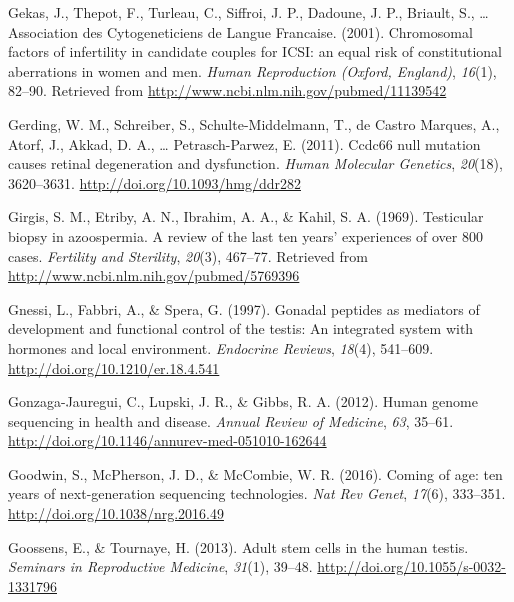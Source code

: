 \documentclass[12pt,twoside]{reedthesis}
\theoremstyle{definition}
\theoremstyle{definition}
\theoremstyle{remark}
\begin{document}
  \hypertarget{ref-Gekas2001}{}
  Gekas, J., Thepot, F., Turleau, C., Siffroi, J. P., Dadoune, J. P.,
  Briault, S., \ldots{} Association des Cytogeneticiens de Langue
  Francaise. (2001). Chromosomal factors of infertility in candidate
  couples for ICSI: an equal risk of constitutional aberrations in women
  and men. \emph{Human Reproduction (Oxford, England)}, \emph{16}(1),
  82--90. Retrieved from \url{http://www.ncbi.nlm.nih.gov/pubmed/11139542}
  
  \hypertarget{ref-Gerding2011}{}
  Gerding, W. M., Schreiber, S., Schulte-Middelmann, T., de Castro
  Marques, A., Atorf, J., Akkad, D. A., \ldots{} Petrasch-Parwez, E.
  (2011). Ccdc66 null mutation causes retinal degeneration and
  dysfunction. \emph{Human Molecular Genetics}, \emph{20}(18), 3620--3631.
  \url{http://doi.org/10.1093/hmg/ddr282}
  
  \hypertarget{ref-Girgis}{}
  Girgis, S. M., Etriby, A. N., Ibrahim, A. A., \& Kahil, S. A. (1969).
  Testicular biopsy in azoospermia. A review of the last ten years'
  experiences of over 800 cases. \emph{Fertility and Sterility},
  \emph{20}(3), 467--77. Retrieved from
  \url{http://www.ncbi.nlm.nih.gov/pubmed/5769396}
  
  \hypertarget{ref-Gnessi1997}{}
  Gnessi, L., Fabbri, A., \& Spera, G. (1997). Gonadal peptides as
  mediators of development and functional control of the testis: An
  integrated system with hormones and local environment. \emph{Endocrine
  Reviews}, \emph{18}(4), 541--609.
  \url{http://doi.org/10.1210/er.18.4.541}
  
  \hypertarget{ref-Gonzaga-Jauregui2012}{}
  Gonzaga-Jauregui, C., Lupski, J. R., \& Gibbs, R. A. (2012). Human
  genome sequencing in health and disease. \emph{Annual Review of
  Medicine}, \emph{63}, 35--61.
  \url{http://doi.org/10.1146/annurev-med-051010-162644}
  
  \hypertarget{ref-Goodwin2016}{}
  Goodwin, S., McPherson, J. D., \& McCombie, W. R. (2016). Coming of age:
  ten years of next-generation sequencing technologies. \emph{Nat Rev
  Genet}, \emph{17}(6), 333--351. \url{http://doi.org/10.1038/nrg.2016.49}
  
  \hypertarget{ref-Goossens2013}{}
  Goossens, E., \& Tournaye, H. (2013). Adult stem cells in the human
  testis. \emph{Seminars in Reproductive Medicine}, \emph{31}(1), 39--48.
  \url{http://doi.org/10.1055/s-0032-1331796}
  
\end{document}
